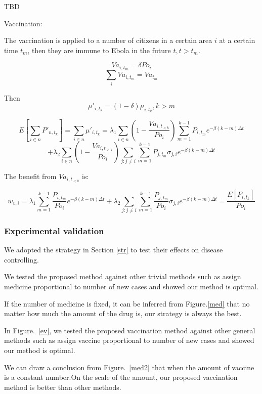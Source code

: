 \documentclass[11pt]{article}
\begin{document}
TBD


Vaccination:

The vaccination is applied to a number of citizens in a certain area $i$ at a certain time $t_m$, then they are immune to Ebola in the future $t,t>t_m$. 

$$Va_{i,t_m} = \delta Po_i $$
$$\sum_i Va_{i,t_m} = Va_{t_m} $$
 

Then 
$$\mu'_{i,t_k} =(1 - \delta) \mu_{i,t_k} , k > m $$ 


$$
E[\sum_{i \in n} {P'_{n,t_k}}] = \sum_{i \in n} \mu'_{i,t_k} = \lambda_1 \sum_{i \in n} \left( 1 - \frac{Va_{i,t_{ < k}}}{Po_i} \right) \sum_{m = 1}^{ k-1} P_{i,t_m} e^{-\beta(k-m)\Delta t} $$
$$ + \lambda_2 \sum_{i \in n}\left( 1 - \frac{Va_{i,t_{< k}}}{Po_i}\right) \sum_{j:j\neq i} \sum_{m = 1}^{ k-1} P_{j,t_m} \sigma_{j,i} e^{-\beta(k-m)\Delta t}
$$

The benefit from $Va_{i,t_{ < k}}$ is:

$$
w_{v,i} = \lambda_1 \sum_{m = 1}^{ k-1} \frac{P_{i,t_m}}{Po_{i}} e^{-\beta(k-m)\Delta t} + \lambda_2 \sum_{j:j\neq i} \sum_{m = 1}^{ k-1} \frac{P_{j,t_m}}{Po_{i}} \sigma_{j,i} e^{-\beta(k-m)\Delta t} = \frac{E[P_{i,t_k}]}{Po_{i}}
$$





\subsubsection{Experimental validation}

We adopted the strategy in Section \ref{str} to test their effects on disease controlling.

We tested the proposed method against other trivial methods such as assign medicine proportional to number of new cases and showed our method is optimal.

If the number of medicine is fixed, it can be inferred from Figure.\ref{med} that no matter how much the amount of the drug is, our strategy is always the best.

In Figure.~\ref{ev}, we tested the proposed vaccination method against other general methods such as assign vaccine proportional to number of new cases and showed our method is optimal.

We can draw a conclusion from Figure.~\ref{med2} that when the amount of vaccine is a constant number.On the scale of the amount, our proposed vaccination method is better than other methods.
\end{document}
